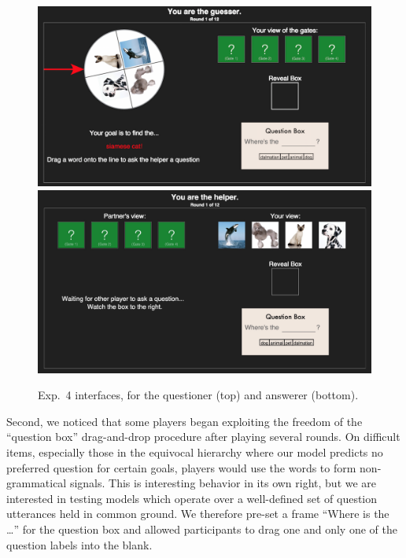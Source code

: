 \documentclass[12pt, floatsintext, man]{apa6}
\begin{document}
	\begin{figure}[t!]
\begin{center}
\includegraphics[scale = .3]{Exp4GuesserViewStart}
\includegraphics[scale = .15]{Exp4HelperViewStart}
\end{center}
\vspace{-.5cm}
\caption{Exp.~4 interfaces, for the questioner (top) and answerer (bottom).}
\vspace{-.1cm}
\label{fig:exp4views}
\end{figure}

Second, we noticed that some players began exploiting the freedom of the ``question box'' drag-and-drop procedure after playing several rounds. On difficult items, especially those in the equivocal hierarchy where our model predicts no preferred question for certain goals, players would use the words to form non-grammatical signals. This is interesting behavior in its own right, but we are interested in testing models which operate over a well-defined set of question utterances held in common ground. We therefore pre-set a frame ``Where is the \dots'' for the question box and allowed participants to drag one and only one of the question labels into the blank. 
\end{document}
